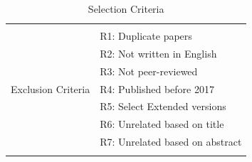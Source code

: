 \begin{table}[h]
\centering
\caption{Selection Criteria}
\label{tab:selection-criteria}
\begin{tabular}{|l|p{5cm}|}
	
\hline
	& \\
	& R1: Duplicate papers \\
   	& R2: Not written in English \\
   	& R3: Not peer-reviewed \\
Exclusion Criteria    
	& R4: Published before 2017 \\
   	& R5: Select Extended versions \\
   	& R6: Unrelated based on title \\
   	& R7: Unrelated based on abstract  \\
   	& \\
\hline
\end{tabular}
\end{table}


